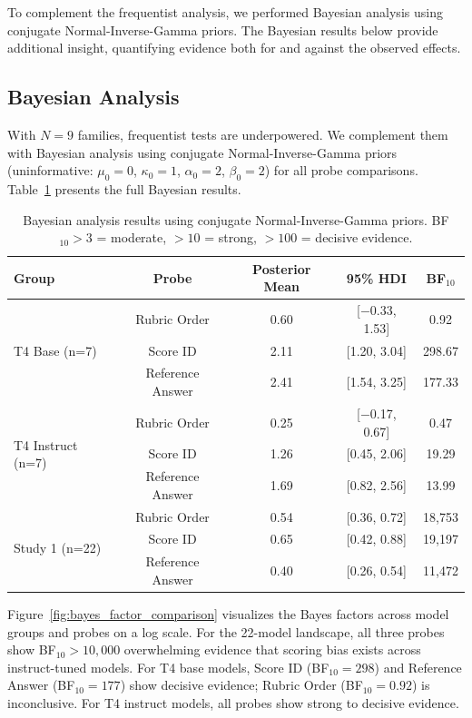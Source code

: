 \documentclass[11pt,twocolumn]{article}
\begin{document}
To complement the frequentist analysis, we performed Bayesian analysis using conjugate Normal-Inverse-Gamma priors. The Bayesian results below provide additional insight, quantifying evidence both for and against the observed effects.

\subsection{Bayesian Analysis}
With $N=9$ families, frequentist tests are underpowered. We complement them with Bayesian analysis using conjugate Normal-Inverse-Gamma priors (uninformative: $\mu_0=0$, $\kappa_0=1$, $\alpha_0=2$, $\beta_0=2$) for all probe comparisons. Table~\ref{tab:bayesian} presents the full Bayesian results.

\begin{table}[h]
\centering\small
\caption{Bayesian analysis results using conjugate Normal-Inverse-Gamma priors. BF$_{10} > 3$ = moderate, $> 10$ = strong, $> 100$ = decisive evidence.}
\label{tab:bayesian}
\begin{tabular}{lcccc}
\toprule
\textbf{Group} & \textbf{Probe} & \textbf{Posterior Mean} & \textbf{95\% HDI} & \textbf{BF$_{10}$} \\
\midrule
\multirow{3}{*}{T4 Base (n=7)}
 & Rubric Order & 0.60 & [$-$0.33, 1.53] & 0.92 \\
 & Score ID & 2.11 & [1.20, 3.04] & 298.67 \\
 & Reference Answer & 2.41 & [1.54, 3.25] & 177.33 \\
\midrule
\multirow{3}{*}{T4 Instruct (n=7)}
 & Rubric Order & 0.25 & [$-$0.17, 0.67] & 0.47 \\
 & Score ID & 1.26 & [0.45, 2.06] & 19.29 \\
 & Reference Answer & 1.69 & [0.82, 2.56] & 13.99 \\
\midrule
\multirow{3}{*}{Study 1 (n=22)}
 & Rubric Order & 0.54 & [0.36, 0.72] & 18,753 \\
 & Score ID & 0.65 & [0.42, 0.88] & 19,197 \\
 & Reference Answer & 0.40 & [0.26, 0.54] & 11,472 \\
\bottomrule
\end{tabular}
\end{table}

Figure~\ref{fig:bayes_factor_comparison} visualizes the Bayes factors across model groups and probes on a log scale. For the 22-model landscape, all three probes show BF$_{10} > 10{,}000$ overwhelming evidence that scoring bias exists across instruct-tuned models. For T4 base models, Score ID (BF$_{10} = 298$) and Reference Answer (BF$_{10} = 177$) show decisive evidence; Rubric Order (BF$_{10} = 0.92$) is inconclusive. For T4 instruct models, all probes show strong to decisive evidence.
\end{document}
